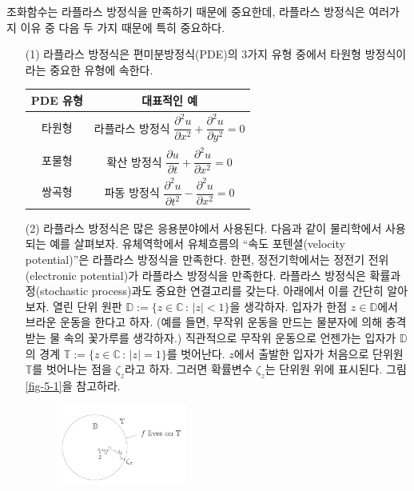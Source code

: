 조화함수는 라플라스 방정식을 만족하기 때문에 중요한데,
라플라스 방정식은 여러가지 이유 중 다음 두 가지 때문에 특히 중요하다.
\begin{itemize}
\item[(1)] 라플라스 방정식은 편미분방정식(PDE)의 3가지 유형 중에서 
타원형 방정식이라는 중요한 유형에 속한다.
\begin{center}
\renewcommand{\arraystretch}{1.5}  %
\begin{tabular}{ |c|c| } 
 \hline
PDE 유형 & 대표적인 예 \\ \hline \hline
타원형 & 라플라스 방정식 
$\dfrac{\partial^2 u}{\partial x^2} 
+ \dfrac{\partial^2 u}{\partial y^2} =0$ \\[1ex] \hline
포물형 & 확산 방정식 $\dfrac{\partial u}{\partial t} 
+ \dfrac{\partial^2 u}{\partial x^2} =0$ \\[1ex] \hline
쌍곡형 & 파동 방정식 $\dfrac{\partial^2 u}{\partial t^2} 
- \dfrac{\partial^2 u}{\partial x^2} =0$ \\[0.5ex]
\hline
\end{tabular}
\end{center}
\item[(2)] 라플라스 방정식은 많은 응용분야에서 사용된다.
다음과 같이 물리학에서 사용되는 예를 살펴보자.
유체역학에서 유체흐름의 ``속도 포텐셜(velocity potential)''은
라플라스 방정식을 만족한다. 한편, 정전기학에서는
정전기 전위(electronic potential)가 라플라스 방정식을 만족한다.
라플라스 방정식은 확률과정(stochastic process)과도 중요한 연결고리를 갖는다.
아래에서 이를 간단히 알아보자.
열린 단위 원판 $\mathbb D:= \{z\in \mathbb C\,:\, |z|<1\}$을 생각하자.
입자가 한점 $z\in\mathbb D$에서 브라운 운동을 한다고 하자.
(예를 들면, 무작위 운동을 만드는 물분자에 의해 충격받는 물 속의
꽃가루를 생각하자.)
직관적으로 무작위 운동으로 언젠가는 입자가 $\mathbb D$의 경계 
$\mathbb T:= \{ z\in \mathbb C \,:\, |z|=1 \}$를 벗어난다.
$z$에서 출발한 입자가 처음으로 단위원 $\mathbb T$를 벗어나는 
점을 $\zeta_z$라고 하자. 그러면 확률변수 $\zeta_z$는 단위원 위에 표시된다.
그림 \ref{fig-5-1}을 참고하라.
\begin{figure}[h!]
\begin{center}
\includegraphics[width=0.4\textwidth]{./SaltChapter/figs/fig-5-1}

\end{center}
\end{figure}
\end{itemize}
